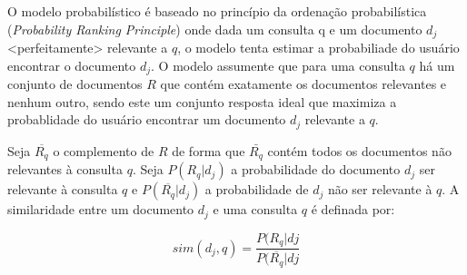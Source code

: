 \documentclass[10pt,a4paper]{article}
\begin{document}
 
O modelo probabilístico é baseado no princípio da ordenação probabilística (\textit{Probability Ranking Principle}) onde dada um consulta q e um documento $d_j$ <perfeitamente> relevante a $q$, o modelo tenta estimar a probabiliade do usuário encontrar o documento $d_j$. O modelo assumente que para uma consulta $q$ há um conjunto de documentos $R$ que contém exatamente os documentos relevantes e nenhum outro, sendo este um conjunto resposta ideal que maximiza a probablidade do usuário encontrar um documento $d_j$ relevante a $q$. 

Seja $\overline{R_q}$ o complemento de $R$ de forma que $\bar{R_q}$ contém todos os documentos não relevantes à consulta $q$. Seja $P(R_q|d_j)$ a probabilidade do documento $d_j$ ser relevante à consulta $q$ e $P(\overline{R_q}|d_j)$ a probabilidade de $d_j$ não ser relevante à $q$. A similaridade entre um documento $d_j$ e uma consulta $q$ é definada por:


\begin{equation}
	sim(d_j, q) = \frac{P(R_q|dj}{P(\overline{R_q}|dj}
\end{equation}




 
\end{document}
